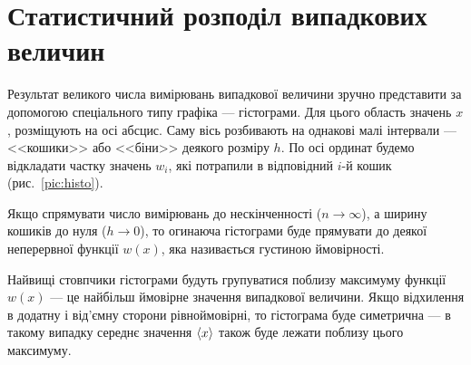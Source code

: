 \documentclass{LabBook}
\begin{document}


\section{Статистичний розподіл випадкових величин}

  Результат великого числа вимірювань випадкової величини зручно представити за допомогою спеціального типу графіка --- гістограми. Для
  цього область значень $x$, розміщують на осі абсцис. Саму вісь розбивають на однакові малі інтервали --- <<кошики>> або <<біни>>  деякого розміру $h$. По осі ординат будемо відкладати частку значень $w_i$, які потрапили в відповідний $i$-й кошик (рис.~\ref{pic:histo}).

  Якщо спрямувати число вимірювань до нескінченності ($n \to \infty$), а ширину кошиків до нуля ($h \to 0$), то огинаюча гістограми буде прямувати до деякої неперервної функції $w(x)$, яка називається густиною ймовірності.

  Найвищі стовпчики гістограми будуть групуватися поблизу максимуму функції $w(x)$ --- це найбільш ймовірне значення випадкової
  величини. Якщо відхилення в додатну і від'ємну сторони рівноймовірні, то гістограма буде симетрична --- в такому випадку середнє значення $\left\langle x \right\rangle$ також буде лежати поблизу цього максимуму.
\end{document}
